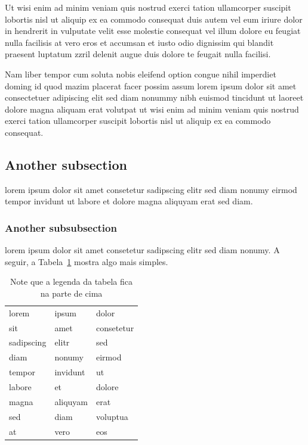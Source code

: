 Ut wisi enim ad minim veniam quis nostrud exerci tation
ullamcorper suscipit lobortis nisl ut aliquip ex ea commodo
consequat duis autem vel eum iriure dolor in hendrerit in
vulputate velit esse molestie consequat vel illum dolore eu
feugiat nulla facilisis at vero eros et accumsan et iusto odio
dignissim qui blandit praesent luptatum zzril delenit augue duis
dolore te feugait nulla facilisi.

Nam liber tempor cum soluta nobis eleifend option congue nihil
imperdiet doming id quod mazim placerat facer possim assum lorem
ipsum dolor sit amet consectetuer adipiscing elit sed diam nonummy
nibh euismod tincidunt ut laoreet dolore magna aliquam erat
volutpat ut wisi enim ad minim veniam quis nostrud exerci tation
ullamcorper suscipit lobortis nisl ut aliquip ex ea commodo
consequat.

\subsection{Another subsection}

lorem ipsum dolor sit amet consetetur sadipscing elitr sed diam
nonumy eirmod tempor invidunt ut labore et dolore magna aliquyam
erat sed diam.~\cite{COFFMANPACKING98}

\subsubsection{Another subsubsection}

lorem ipsum dolor sit amet consetetur sadipscing elitr sed diam
nonumy. A seguir, a Tabela~\ref{tab:tab2} mostra algo mais
simples.

\begin{table}
\begin{center}%
\caption{\label{tab:tab2}Note que a legenda da tabela fica na parte de cima}%
\begin{tabular*}{.7\linewidth}{@{\extracolsep{\fill}}lll}%
\noalign{\smallskip}
\hline
lorem & ipsum & dolor \tabularnewline
sit & amet & consetetur \tabularnewline
sadipscing & elitr & sed \tabularnewline
diam & nonumy & eirmod \tabularnewline
tempor & invidunt & ut \tabularnewline
labore & et & dolore \tabularnewline
magna & aliquyam & erat \tabularnewline
sed & diam & voluptua \tabularnewline
at & vero & eos \tabularnewline
\end{tabular*}
\end{center}
\end{table}

